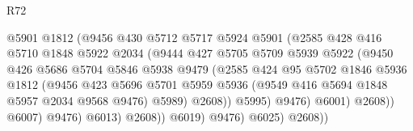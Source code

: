 \begin{lexlean}{R72}
\begin{coremodule}
                                    @5901
                                    @1812
                                    (@9456
                                      @430
                                      @5712
                                      @5717
                                      @5924
                                      @5901
                                      (@2585
                                        @428
                                        @416
                                        @5710
                                        @1848
                                        @5922
                                        @2034
                                        (@9444
                                          @427
                                          @5705
                                          @5709
                                          @5939
                                          @5922
                                          (@9450
                                            @426
                                            @5686
                                            @5704
                                            @5846
                                            @5938
                                            @9479
                                            (@2585
                                              @424
                                              @95
                                              @5702
                                              @1846
                                              @5936
                                              @1812
                                              (@9456
                                                @423
                                                @5696
                                                @5701
                                                @5959
                                                @5936
                                                (@9549 @416 @5694 @1848 @5957 @2034 @9568 @9476)
                                                @5989)
                                              @2608))
                                          @5995)
                                        @9476)
                                      @6001)
                                    @2608))
                                @6007)
                              @9476)
                            @6013)
                          @2608))
                      @6019)
                    @9476)
                  @6025)
                @2608))

\end{coremodule}
\end{lexlean}
